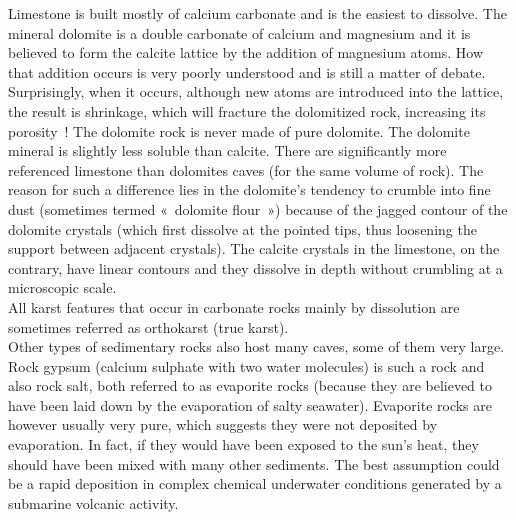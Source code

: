\documentclass[draft, final]{report}
\begin{document}
Limestone is built mostly of calcium carbonate and is the easiest to dissolve. The mineral dolomite is a double carbonate of calcium and magnesium  and it is believed to form the calcite lattice by the addition of magnesium atoms. How that addition occurs is very poorly understood and is still a matter of debate. Surprisingly, when it occurs, although new atoms are introduced into the lattice, the result is shrinkage, which will fracture the dolomitized rock, increasing its porosity ! The dolomite rock is never made of pure dolomite. The dolomite mineral is slightly less soluble than calcite. There are significantly more referenced limestone than dolomites caves (for the same volume of rock).  The reason for such a difference lies in the dolomite's tendency to crumble into fine dust (sometimes termed « dolomite flour ») because of the jagged contour of the dolomite crystals (which first dissolve at the pointed tips, thus loosening the support between adjacent crystals). The calcite crystals in the limestone, on the contrary, have linear contours and they dissolve in depth without crumbling at a microscopic scale.\\

All karst features that occur in carbonate rocks mainly by dissolution are sometimes referred as orthokarst (true karst). \\

Other types of sedimentary rocks also host many caves, some of them very large. Rock gypsum (calcium sulphate with two water molecules) is such a rock and also rock salt, both referred to as evaporite rocks (because they are believed to have been laid down by the evaporation of salty  seawater). Evaporite rocks are however usually very pure, which suggests they were not deposited by evaporation. In fact, if they would have been exposed to the sun's heat, they should have been mixed with many other sediments. The best assumption could be a rapid deposition in complex chemical underwater conditions generated by a submarine volcanic activity.
\end{document}
